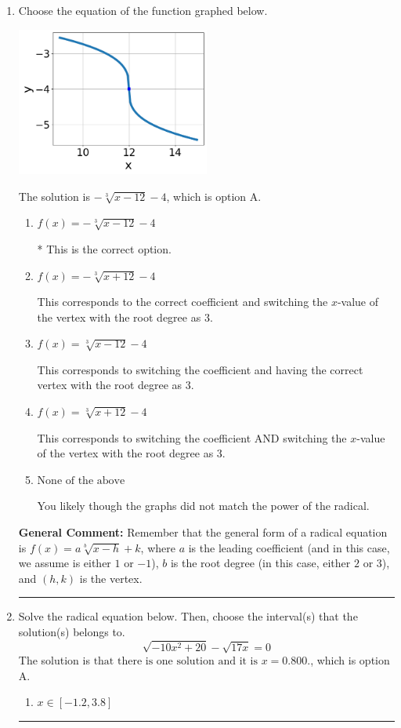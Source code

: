 \documentclass{extbook}[14pt]
\newcommand{\litem}[1]{\item #1

\rule{\textwidth}{0.4pt}}
\begin{document}
\begin{enumerate}\litem{
Choose the equation of the function graphed below.

\begin{center}
    \includegraphics[width=0.5\textwidth]{../Figures/radicalGraphToEquationB.png}
\end{center}



The solution is \( - \sqrt[3]{x - 12} - 4 \), which is option A.\begin{enumerate}[label=\Alph*.]
\item \( f(x) = - \sqrt[3]{x - 12} - 4 \)

* This is the correct option.
\item \( f(x) = - \sqrt[3]{x + 12} - 4 \)

This corresponds to the correct coefficient and switching the $x$-value of the vertex with the root degree as $3$.
\item \( f(x) = \sqrt[3]{x - 12} - 4 \)

This corresponds to switching the coefficient and having the correct vertex with the root degree as $3$.
\item \( f(x) = \sqrt[3]{x + 12} - 4 \)

This corresponds to switching the coefficient AND switching the $x$-value of the vertex with the root degree as $3$.
\item \( \text{None of the above} \)

You likely though the graphs did not match the power of the radical.
\end{enumerate}

\textbf{General Comment:} Remember that the general form of a radical equation is $ f(x) = a \sqrt[b]{x - h} + k$, where $a$ is the leading coefficient (and in this case, we assume is either $1$ or $-1$), $b$ is the root degree (in this case, either $2$ or $3$), and $(h, k)$ is the vertex.
}
\litem{
Solve the radical equation below. Then, choose the interval(s) that the solution(s) belongs to.
\[ \sqrt{-10 x^2 + 20} - \sqrt{17 x} = 0 \]
The solution is \( \text{that there is one solution and it is } x = 0.800. \), which is option A.\begin{enumerate}[label=\Alph*.]
\item \( x \in [-1.2,3.8] \)


\end{enumerate}}
\end{enumerate}
\end{document}
